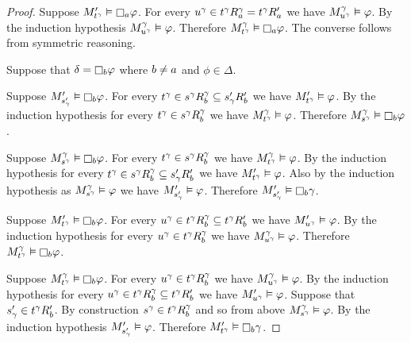 \begin{proof}
Suppose $\kPModelP{\kStateT[\gamma]} \entails \necessaryA \phi$.
For every $\kStateU[\gamma] \in \kSuccessorsA[\gamma]{\kStateT[\gamma]} = \kSuccessorsPA{\kStateT[\gamma]}$ we have $\kPModel[\gamma]{\kStateU[\gamma]} \entails \phi$.
By the induction hypothesis $\kPModel[\gamma]{\kStateU[\gamma]} \entails \phi$.
Therefore $\kPModel[\gamma]{\kStateT[\gamma]} \entails \necessaryA \phi$.
The converse follows from symmetric reasoning.

Suppose that $\delta = \necessaryB \phi$ where $\agentB \neq \agentA$ and $\phi \in \Delta$.

Suppose $\kPModelP{\kStateSP_\gamma} \entails \necessaryB \phi$.
For every $\kStateT[\gamma] \in \kSuccessorsB[\gamma]{\kStateS[\gamma]} \subseteq \kSuccessorsPB{\kStateSP_\gamma}$ we have $\kPModelP{\kStateT[\gamma]} \entails \phi$.
By the induction hypothesis for every $\kStateT[\gamma] \in \kSuccessorsB[\gamma]{\kStateS[\gamma]}$ we have $\kPModel[\gamma]{\kStateT[\gamma]} \entails \phi$.
Therefore $\kPModel[\gamma]{\kStateS[\gamma]} \entails \necessaryB \phi$.

Suppose $\kPModel[\gamma]{\kStateS[\gamma]} \entails \necessaryB \phi$.
For every $\kStateT[\gamma] \in \kSuccessorsB[\gamma]{\kStateS[\gamma]}$ we have $\kPModel[\gamma]{\kStateT[\gamma]} \entails \phi$.
By the induction hypothesis for every $\kStateT[\gamma] \in \kSuccessorsB[\gamma]{\kStateS[\gamma]} \subseteq \kSuccessorsPB{\kStateSP_\gamma}$ we have $\kPModelP{\kStateT[\gamma]} \entails \phi$.
Also by the induction hypothesis as $\kPModel[\gamma]{\kStateS[\gamma]} \entails \phi$ we have $\kPModelP{\kStateSP_\gamma} \entails \phi$.
Therefore $\kPModelP{\kStateSP_\gamma} \entails \necessaryB \gamma$.

Suppose $\kPModelP{\kStateT[\gamma]} \entails \necessaryB \phi$.
For every $\kStateU[\gamma] \in \kSuccessorsB[\gamma]{\kStateT[\gamma]} \subseteq \kSuccessorsPB{\kStateT[\gamma]}$ we have $\kPModelP{\kStateU[\gamma]} \entails \phi$.
By the induction hypothesis for every $\kStateU[\gamma] \in \kSuccessorsB[\gamma]{\kStateT[\gamma]}$ we have $\kPModel[\gamma]{\kStateU[\gamma]} \entails \phi$.
Therefore $\kPModel[\gamma]{\kStateT[\gamma]} \entails \necessaryB \phi$.

Suppose $\kPModel[\gamma]{\kStateT[\gamma]} \entails \necessaryB \phi$.
For every $\kStateU[\gamma] \in \kSuccessorsB[\gamma]{\kStateT[\gamma]}$ we have $\kPModel[\gamma]{\kStateU[\gamma]} \entails \phi$.
By the induction hypothesis for every $\kStateU[\gamma] \in \kSuccessorsB[\gamma]{\kStateT[\gamma]} \subseteq \kSuccessorsPB{\kStateT[\gamma]}$ we have $\kPModelP{\kStateU[\gamma]} \entails \phi$.
Suppose that $\kStateSP_\gamma \in \kSuccessorsPB{\kStateT[\gamma]}$.
By construction $\kStateS[\gamma] \in \kSuccessorsB[\gamma]{\kStateT[\gamma]}$ and so from above $\kPModel[\gamma]{\kStateS[\gamma]} \entails \phi$.
By the induction hypothesis $\kPModelP{\kStateSP_\gamma} \entails \phi$.
Therefore $\kPModelP{\kStateT[\gamma]} \entails \necessaryB \gamma$.


\end{proof}
